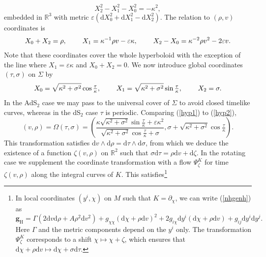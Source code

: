 \documentclass[11pt, reqno]{amsart}
\newcommand{\R}{\mathbb{R}}
\theoremstyle{plain}
\theoremstyle{definition}
\numberwithin{equation}{section}
\begin{document}
\begin{equation*}
    X_2^2 - X_1^2-X_0^2 = -\kappa^2,
\end{equation*}
embedded in $\R^{3}$ with metric $\varepsilon(\text{d}X_0^2  +\text{d}X_1^2 - \text{d}X_2^2)$. The relation to $(\rho,v)$ coordinates is 
\begin{equation} \label{hyp1}
    X_0 +X_2 = \rho, \hspace{.8cm} X_1 = \kappa^{-1}\rho v -\varepsilon\kappa, \hspace{.8cm} X_2 - X_0 = \kappa^{-2}\rho v^2-2\varepsilon v.
\end{equation}
Note that these coordinates cover the whole hyperboloid with the exception of the line where $X_1 = \varepsilon\kappa$ and $X_0 + X_2 = 0$. We now introduce global coordinates $(\tau,\sigma)$ on $\Sigma$ by
\begin{equation} \label{hyp2}
    X_0 = \sqrt{\kappa^2 + \sigma^2}\cos\tfrac{\tau}{\kappa}, \hspace{.8cm} X_1 = \sqrt{\kappa^2 + \sigma^2}\sin \tfrac{\tau}{\kappa}, \hspace{.8cm} X_2 = \sigma.
\end{equation}
In the AdS$_2$ case we may pass to the universal cover of $\Sigma$ to avoid closed timelike curves, whereas in the dS$_2$ case $\tau$ is periodic. Comparing (\ref{hyp1}) to (\ref{hyp2}),
\begin{equation}
    (v,\rho) = \Omega(\tau,\sigma) = \left(\frac{\kappa\sqrt{\kappa^2+\sigma^2}\sin\frac{\tau}{\kappa} +\varepsilon\kappa^2}{\sqrt{\kappa^2 + \sigma^2}\cos\frac{\tau}{\kappa} + \sigma},\sigma + \sqrt{\kappa^2 + \sigma^2}\cos \tfrac{\tau}{\kappa}\right).
\end{equation}
This transformation satisfies $\text{d}v\wedge\text{d}\rho = \text{d}\tau \wedge\text{d}\sigma$, from which we deduce the existence of a function $\zeta(v,\rho)$ on $\mathbb{R}^2$ such that $\sigma\text{d}\tau = \rho\text{d}v + \text{d}\zeta$. In the rotating case we supplement the coordinate transformation with a flow $\Psi^K_\zeta$ for time $\zeta(v,\rho)$ along the integral curves of $K$. This satisfies\footnote{In local coordinates $(y^i,\chi)$ on $M$ such that $K = \partial_\chi$, we can write (\ref{nhgenh}) as 
\begin{equation*}
        \textbf{g}_{\text{H}} = \Gamma(2\text{d}v\text{d}\rho + A\rho^2\text{d}v^2) + g_{\chi\chi}(\text{d}\chi +\rho\text{d}v)^2 + 2g_{i\chi}\text{d}y^i(\text{d}\chi + \rho\text{d}v) + g_{ij}\text{d}y^i\text{d}y^j.
\end{equation*}
Here $\Gamma$ and the metric components depend on the $y^i$ only. The transformation $\Psi^K_\zeta$ corresponds to a shift $\chi \mapsto \chi + \zeta$, which ensures that $\text{d}\chi +\rho\text{d}v \mapsto \text{d}\chi + \sigma\text{d}\tau$.}
\end{document}

